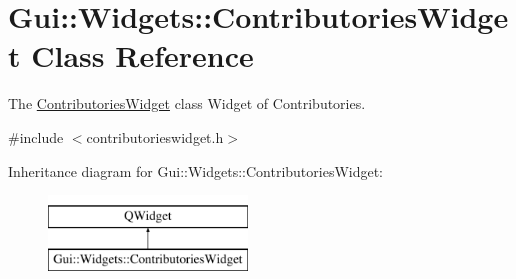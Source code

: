 \hypertarget{classGui_1_1Widgets_1_1ContributoriesWidget}{\section{Gui\-:\-:Widgets\-:\-:Contributories\-Widget Class Reference}
\label{classGui_1_1Widgets_1_1ContributoriesWidget}
}


The \hyperlink{classGui_1_1Widgets_1_1ContributoriesWidget}{Contributories\-Widget} class Widget of Contributories.  




{\ttfamily \#include $<$contributorieswidget.\-h$>$}

Inheritance diagram for Gui\-:\-:Widgets\-:\-:Contributories\-Widget\-:\begin{figure}[H]
\begin{center}
\leavevmode
\includegraphics[height=2.000000cm]{dc/da3/classGui_1_1Widgets_1_1ContributoriesWidget}
\end{center}
\end{figure}
